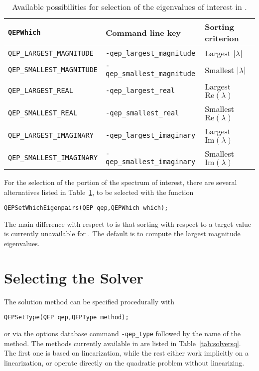 \begin{table}
\centering
{\small \begin{tabular}{lll}
\texttt{QEPWhich}                  & Command line key                   & Sorting criterion \\\hline
\texttt{QEP\_LARGEST\_MAGNITUDE}   & \texttt{-qep\_largest\_magnitude}  & Largest $|\lambda|$ \\
\texttt{QEP\_SMALLEST\_MAGNITUDE}  & \texttt{-qep\_smallest\_magnitude} & Smallest $|\lambda|$ \\
\texttt{QEP\_LARGEST\_REAL}        & \texttt{-qep\_largest\_real}       & Largest $\mathrm{Re}(\lambda)$ \\
\texttt{QEP\_SMALLEST\_REAL}       & \texttt{-qep\_smallest\_real}      & Smallest $\mathrm{Re}(\lambda)$ \\
\texttt{QEP\_LARGEST\_IMAGINARY}   & \texttt{-qep\_largest\_imaginary}  & Largest $\mathrm{Im}(\lambda)$\footnotemark \\
\texttt{QEP\_SMALLEST\_IMAGINARY}  & \texttt{-qep\_smallest\_imaginary} & Smallest $\mathrm{Im}(\lambda)$\addtocounter{footnote}{-1}\footnotemark \\\hline
\end{tabular} }
\caption{\label{tab:portionq}Available possibilities for selection of the eigenvalues of interest in .}
\end{table}


	For the selection of the portion of the spectrum of interest, there are several alternatives listed in Table~\ref{tab:portionq}, to be selected with the function
	\begin{Verbatim}[fontsize=\small]
	QEPSetWhichEigenpairs(QEP qep,QEPWhich which);
	\end{Verbatim}
The main difference with respect to  is that sorting with respect to a target value is currently unavailable for . The default is to compute the largest magnitude eigenvalues.


\section{Selecting the Solver}

The solution method can be specified procedurally with
	\begin{Verbatim}[fontsize=\small]
	QEPSetType(QEP qep,QEPType method);
	\end{Verbatim}
or via the options database command \Verb!-qep_type! followed by the name of the method. The methods currently available in  are listed in Table~\ref{tab:solversq}. The first one is based on linearization, while the rest either work implicitly on a linearization, or operate directly on the quadratic problem without linearizing.

